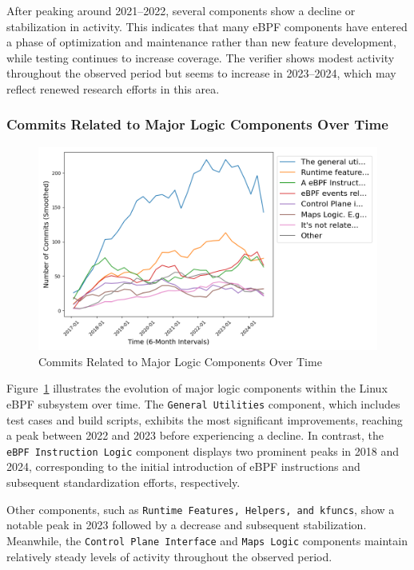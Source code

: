 After peaking around 2021--2022, several components show a decline or stabilization in activity. This indicates that many eBPF components have entered a phase of optimization and maintenance rather than new feature development, while testing continues to increase coverage. The verifier shows modest activity throughout the observed period but seems to increase in 2023--2024, which may reflect renewed research efforts in this area.

\subsubsection{Commits Related to Major Logic Components Over Time}

\begin{figure}[ht]
    \centering
    \includegraphics[width=\linewidth]{feature-analysis/timeline_major_related_logic_component_smoothed.png}
    \caption{Commits Related to Major Logic Components Over Time}
    \label{fig:timeline_major_related_logic_component_smoothed}
\end{figure}

Figure~\ref{fig:timeline_major_related_logic_component_smoothed} illustrates the evolution of major logic components within the Linux eBPF subsystem over time. The \texttt{General Utilities} component, which includes test cases and build scripts, exhibits the most significant improvements, reaching a peak between 2022 and 2023 before experiencing a decline. In contrast, the \texttt{eBPF Instruction Logic} component displays two prominent peaks in 2018 and 2024, corresponding to the initial introduction of eBPF instructions and subsequent standardization efforts, respectively.

Other components, such as \texttt{Runtime Features, Helpers, and kfuncs}, show a notable peak in 2023 followed by a decrease and subsequent stabilization. Meanwhile, the \texttt{Control Plane Interface} and \texttt{Maps Logic} components maintain relatively steady levels of activity throughout the observed period.

